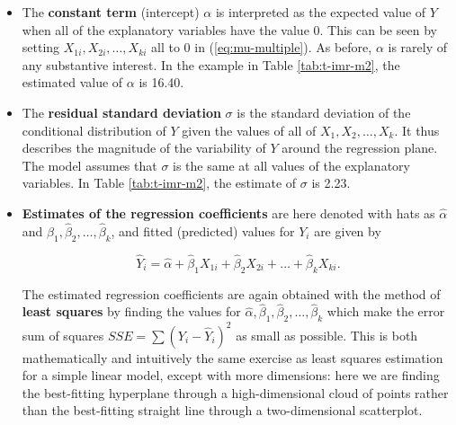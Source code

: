 \documentclass[11pt,a4paper,openany]{book}
\begin{document}
\begin{itemize}
\item
  The \textbf{constant term} (intercept) \(\alpha\) is interpreted as
  the expected value of \(Y\) when all of the explanatory variables have
  the value 0. This can be seen by setting
  \(X_{1i}, X_{2i}, \dots, X_{ki}\) all to 0 in (\ref{eq:mu-multiple}).
  As before, \(\alpha\) is rarely of any substantive interest. In the
  example in Table \ref{tab:t-imr-m2}, the estimated value of \(\alpha\)
  is 16.40.
\item
  The \textbf{residual standard deviation} \(\sigma\) is the standard
  deviation of the conditional distribution of \(Y\) given the values of
  all of \(X_{1}, X_{2}, \dots, X_{k}\). It thus describes the magnitude
  of the variability of \(Y\) around the regression plane. The model
  assumes that \(\sigma\) is the same at all values of the explanatory
  variables. In Table \ref{tab:t-imr-m2}, the estimate of \(\sigma\) is
  2.23.
\item
  \textbf{Estimates of the regression coefficients} are here denoted
  with hats as \(\hat{\alpha}\) and
  \(\hat{\beta}_{1}, \hat{\beta}_{2}, \dots, \hat{\beta}_{k}\), and
  fitted (predicted) values for \(Y_{i}\) are given by

  \begin{equation}\hat{Y}_{i}=\hat{\alpha}+\hat{\beta}_{1}X_{1i}+\hat{\beta}_{2}X_{2i}+\dots+
  \hat{\beta}_{k}X_{ki}.
  \label{eq:Yhat}\end{equation}

  The estimated regression coefficients are again obtained with the
  method of \textbf{least squares} by finding the values for
  \(\hat{\alpha}, \hat{\beta}_{1}, \hat{\beta}_{2}, \dots, \hat{\beta}_{k}\)
  which make the error sum of squares
  \(SSE=\sum (Y_{i}-\hat{Y}_{i})^{2}\) as small as possible. This is
  both mathematically and intuitively the same exercise as least squares
  estimation for a simple linear model, except with more dimensions:
  here we are finding the best-fitting hyperplane through a
  high-dimensional cloud of points rather than the best-fitting straight
  line through a two-dimensional scatterplot.


\end{itemize}
\end{document}
